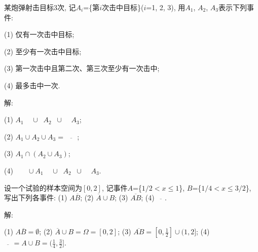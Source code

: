 \documentclass[standard]{ExBook}
\begin{document}
\begin{qitems}
    \begin{bbox}
    \begin{shaded}
        \qitem 
某炮弹射击目标3次, 记$A_{i}$=\{第$i$次击中目标\}($i$=1, 2, 3), 用$A_{1}$, $A_{2}$, $A_{3}$表示下列事件:

(1) 仅有一次击中目标;

(2) 至少有一次击中目标;

(3) 第一次击中且第二次、第三次至少有一次击中;

(4) 最多击中一次.
    \end{shaded}
    \end{bbox}

\vspace{-5em}

    \begin{bbox}
解: 

(1) $A_{1}\mathop{\overline{A_{2}}}\mathop{\overline{A_{3}}}\cup\mathop{\overline{A_{1}}}A_{2}\mathop{\overline{A_{3}}}\cup\mathop{\overline{A_{1}}}\mathop{\overline{A_{2}}}A_{3}$;

(2) $A_{1}\cup A_{2}\cup A_{3}=\overline{\mathop{\overline{A_{1}}}\mathop{\overline{A_{2}}}\mathop{\overline{A_{3}}}}$;

(3) $A_{1}\cap(A_{2}\cup A_{3})$;

(4) $\mathop{\overline{A_{1}}}\mathop{\overline{A_{2}}}\mathop{\overline{A_{3}}}\cup A_{1}\mathop{\overline{A_{2}}}\mathop{\overline{A_{3}}}\cup \mathop{\overline{A_{1}}}A_{2}\mathop{\overline{A_{3}}}\cup\mathop{\overline{A_{1}}}\mathop{\overline{A_{2}}}A_{3}$.
    \end{bbox}

\vspace{-5em}

    \begin{bbox}
    \begin{shaded}
        \qitem
设一个试验的样本空间为$[0,2]$, 记事件$A$=\{$1/2 < x \leq 1$\}, $B$=\{$1/4 < x \leq 3/2$\}, 写出下列各事件:
(1) $A\overline{B}$;\qquad
(2) $\overline{A}\cup B$;\qquad
(3) $\overline{AB}$;\qquad
(4) $\overline{\mathop{\overline{A}}\mathop{\overline{B}}}$.
    \end{shaded}
    \end{bbox}

\vspace{-5em}

    \begin{bbox}
解:

(1) $A\overline{B}=\emptyset$;\qquad
(2) $\overline{A}\cup B=\Omega=[0,2]$;\qquad
(3) $\overline{AB}=[0,\frac{1}{2}]\cup(1,2]$;\qquad
(4) $\overline{\mathop{\overline{A}}\mathop{\overline{B}}}=A\cup B=(\frac{1}{4},\frac{3}{2}]$.
    \end{bbox}


\end{qitems}
\end{document}
